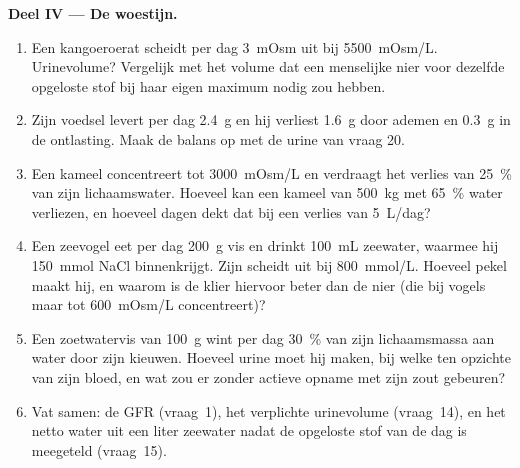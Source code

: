 \begin{problem}
\medskip
\noindent\textbf{Deel IV --- De woestijn.}
\begin{enumerate}[resume]
  \item Een kangoeroerat scheidt per dag \qty{3}{mOsm} uit bij
        \qty{5500}{mOsm/L}. Urinevolume? Vergelijk met het volume dat
        een menselijke nier voor dezelfde opgeloste stof bij haar eigen
        maximum nodig zou hebben.
  \item Zijn voedsel levert per dag \qty{2.4}{g}  en hij
        verliest \qty{1.6}{g} door ademen en \qty{0.3}{g} in de
        ontlasting. Maak de balans op met de urine van vraag 20.
  \item Een kameel concentreert tot \qty{3000}{mOsm/L} en verdraagt het
        verlies van \qty{25}{\%} van zijn lichaamswater. Hoeveel kan
        een kameel van \qty{500}{kg} met \qty{65}{\%} water verliezen,
        en hoeveel dagen dekt dat bij een verlies van \qty{5}{L/dag}?
  \item Een zeevogel eet per dag \qty{200}{g} vis en drinkt
        \qty{100}{mL} zeewater, waarmee hij \qty{150}{mmol} NaCl
        binnenkrijgt. Zijn  scheidt uit bij \qty{800}{mmol/L}.
        Hoeveel pekel maakt hij, en waarom is de klier hiervoor beter
        dan de nier (die bij vogels maar tot \qty{600}{mOsm/L}
        concentreert)?
  \item Een zoetwatervis van \qty{100}{g} wint per dag \qty{30}{\%} van
        zijn lichaamsmassa aan water door zijn kieuwen. Hoeveel urine
        moet hij maken, bij welke  ten opzichte van zijn
        bloed, en wat zou er zonder actieve opname met zijn zout
        gebeuren?
  \item Vat samen: de GFR (vraag~1), het verplichte urinevolume
        (vraag~14), en het netto water uit een liter zeewater nadat de
        opgeloste stof van de dag is meegeteld (vraag~15).
\end{enumerate}
\end{problem}
